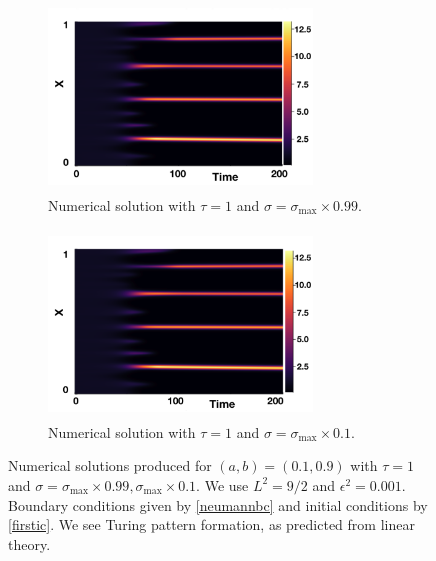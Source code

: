 \begin{figure}[H]
    \centering
    \begin{subfigure}[t]{0.45\textwidth}
        \centering
        \includegraphics[width=7cm,height=5cm]{distp1sig1.png}
        \caption{Numerical solution with $\tau=1$ and $\sigma=\sigma_{\max}\times0.99$.}
        \label{}
    \end{subfigure}
    \hfill
    \begin{subfigure}[t]{0.45\textwidth}
        \centering
        \includegraphics[width=7cm,height=5cm]{distp1sig2.png}
        \caption{Numerical solution with $\tau=1$ and $\sigma=\sigma_{\max}\times0.1$.}
        \label{}
    \end{subfigure}
    \caption{Numerical solutions produced for $(a,b)=(0.1,0.9)$ with $\tau=1$ and $\sigma=\sigma_{\max}\times0.99, \sigma_{\max}\times0.1$. We use $L^2=9/2$ and $\epsilon^2=0.001$.
    Boundary conditions given by \eqref{neumannbc} and initial conditions by \eqref{firstic}. We see Turing pattern formation, as predicted from linear theory.}
    \label{fig:testdist1}
\end{figure}

